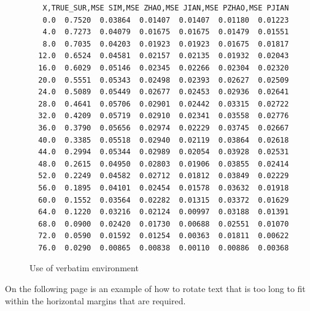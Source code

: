 \begin{figure}[h]
\baselineskip=14pt
\begin{verbatim}
   X,TRUE_SUR,MSE SIM,MSE ZHAO,MSE JIAN,MSE PZHAO,MSE PJIAN
   0.0  0.7520  0.03864  0.01407  0.01407  0.01180  0.01223
   4.0  0.7273  0.04079  0.01675  0.01675  0.01479  0.01551
   8.0  0.7035  0.04203  0.01923  0.01923  0.01675  0.01817
  12.0  0.6524  0.04581  0.02157  0.02135  0.01932  0.02043
  16.0  0.6029  0.05146  0.02345  0.02266  0.02304  0.02320
  20.0  0.5551  0.05343  0.02498  0.02393  0.02627  0.02509
  24.0  0.5089  0.05449  0.02677  0.02453  0.02936  0.02641
  28.0  0.4641  0.05706  0.02901  0.02442  0.03315  0.02722
  32.0  0.4209  0.05719  0.02910  0.02341  0.03558  0.02776
  36.0  0.3790  0.05656  0.02974  0.02229  0.03745  0.02667
  40.0  0.3385  0.05518  0.02940  0.02119  0.03864  0.02618
  44.0  0.2994  0.05344  0.02989  0.02054  0.03928  0.02531
  48.0  0.2615  0.04950  0.02803  0.01906  0.03855  0.02414
  52.0  0.2249  0.04582  0.02712  0.01812  0.03849  0.02229
  56.0  0.1895  0.04101  0.02454  0.01578  0.03632  0.01918
  60.0  0.1552  0.03564  0.02282  0.01315  0.03372  0.01629
  64.0  0.1220  0.03216  0.02124  0.00997  0.03188  0.01391
  68.0  0.0900  0.02420  0.01730  0.00688  0.02551  0.01070
  72.0  0.0590  0.01592  0.01254  0.00363  0.01811  0.00622
  76.0  0.0290  0.00865  0.00838  0.00110  0.00886  0.00368
\end{verbatim}
\caption{Use of verbatim environment}
\end{figure}

On the following page is an example of how to rotate text  that is too long to fit within the horizontal margins that are required.


